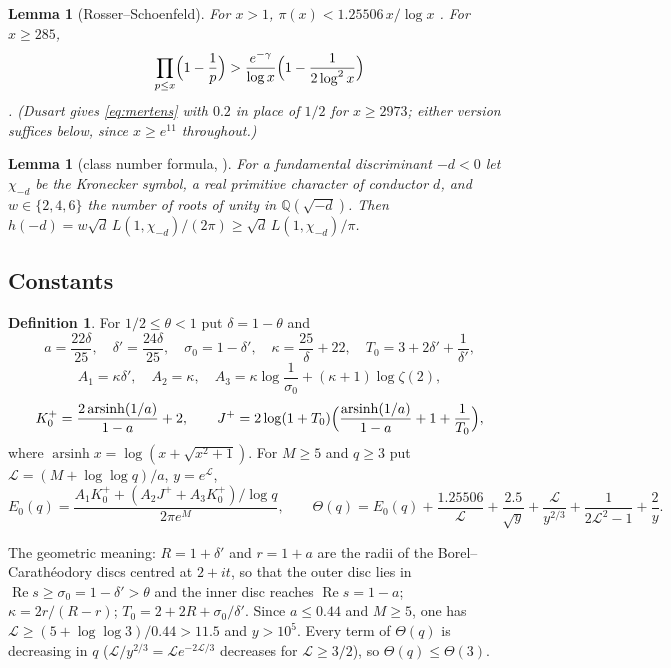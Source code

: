 \documentclass[11pt]{article}
\newtheorem{lemma}[theorem]{Lemma}
\theoremstyle{definition}
\newtheorem{definition}[theorem]{Definition}
\theoremstyle{remark}
\numberwithin{equation}{section}
\newcommand{\Q}{\mathbb Q}
\newcommand{\Rea}{\operatorname{Re}}
\newcommand{\asinh}{\operatorname{arsinh}}
\begin{document}
\begin{lemma}[Rosser--Schoenfeld]\label{lem:rs}
For $x>1$, $\pi(x)<1.25506\,x/\log x$ \textup{\cite[(3.6)]{rs1962}}. For $x\ge285$,
\begin{equation}\label{eq:mertens}
 \prod_{p\le x}\Bigl(1-\frac1p\Bigr)>\frac{e^{-\gamma}}{\log x}\Bigl(1-\frac1{2\log^2x}\Bigr)
\end{equation}
\textup{\cite[Theorem~7, (3.25)]{rs1962}}. (Dusart \textup{\cite[Theorem~6.12]{dusart2010}} gives \eqref{eq:mertens} with $0.2$ in place of $1/2$ for $x\ge2973$; either version suffices below, since $x\ge e^{11}$ throughout.)
\end{lemma}

\begin{lemma}[class number formula, {\cite[Chapter~6]{davenport2000}}]\label{lem:cnf}
For a fundamental discriminant $-d<0$ let $\chi_{-d}$ be the Kronecker symbol, a real primitive character of conductor $d$, and $w\in\{2,4,6\}$ the number of roots of unity in $\Q(\sqrt{-d})$. Then $h(-d)=w\sqrt d\,L(1,\chi_{-d})/(2\pi)\ge\sqrt d\,L(1,\chi_{-d})/\pi$.
\end{lemma}

\subsection{Constants}\label{sec:const}

\begin{definition}\label{def:const}
For $1/2\le\theta<1$ put $\delta=1-\theta$ and
\[
 a=\frac{22\delta}{25},\quad \delta'=\frac{24\delta}{25},\quad \sigma_0=1-\delta',\quad
 \kappa=\frac{25}{\delta}+22,\quad T_0=3+2\delta'+\frac1{\delta'},
\]
\[
 A_1=\kappa\delta',\quad A_2=\kappa,\quad A_3=\kappa\log\frac1{\sigma_0}+(\kappa+1)\log\zeta(2),
\]
\[
 K_0^+=\frac{2\asinh(1/a)}{1-a}+2,\qquad J^+=2\log(1+T_0)\Bigl(\frac{\asinh(1/a)}{1-a}+1+\frac1{T_0}\Bigr),
\]
where $\asinh x=\log(x+\sqrt{x^2+1})$. For $M\ge5$ and $q\ge3$ put $\mathcal L=(M+\log\log q)/a$, $y=e^{\mathcal L}$,
\[
 E_0(q)=\frac{A_1K_0^++(A_2J^++A_3K_0^+)/\log q}{2\pi e^{M}},\qquad
 \Theta(q)=E_0(q)+\frac{1.25506}{\mathcal L}+\frac{2.5}{\sqrt y}+\frac{\mathcal L}{y^{2/3}}+\frac1{2\mathcal L^2-1}+\frac2y .
\]
\end{definition}

The geometric meaning: $R=1+\delta'$ and $r=1+a$ are the radii of the Borel--Carath\'eodory discs centred at $2+it$, so that the outer disc lies in $\Rea s\ge\sigma_0=1-\delta'>\theta$ and the inner disc reaches $\Rea s=1-a$; $\kappa=2r/(R-r)$; $T_0=2+2R+\sigma_0/\delta'$. Since $a\le0.44$ and $M\ge5$, one has $\mathcal L\ge(5+\log\log3)/0.44>11.5$ and $y>10^5$. Every term of $\Theta(q)$ is decreasing in $q$ ($\mathcal L/y^{2/3}=\mathcal Le^{-2\mathcal L/3}$ decreases for $\mathcal L\ge3/2$), so $\Theta(q)\le\Theta(3)$.
\end{document}
